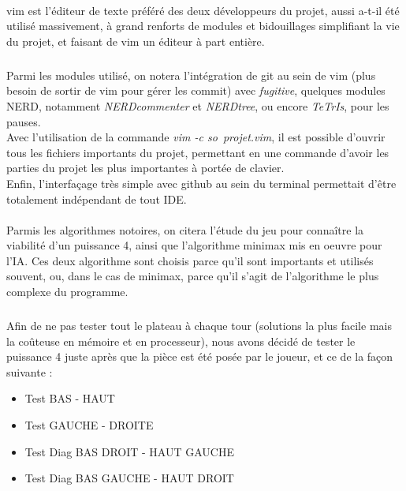 \documentclass{report}
\begin{document}
    \paragraph*{} %
    vim est l'éditeur de texte préféré des deux développeurs du projet, aussi a-t-il été utilisé massivement, à grand renforts de modules et bidouillages simplifiant la vie du projet, et
        faisant de vim un éditeur à part entière.
        \subparagraph*{} %
        Parmi les modules utilisé, on notera l'intégration de git au sein de vim (plus besoin de sortir de vim pour gérer les commit) avec \textit{fugitive}, quelques modules NERD, 
            notamment \textit{NERDcommenter} et \textit{NERDtree}, ou encore \textit{TeTrIs}, pour les pauses. \\
        Avec l'utilisation de la commande \textit{vim -c so\ projet.vim}, il est possible d'ouvrir tous les fichiers importants du projet, permettant en une commande d'avoir les 
            parties du projet les plus importantes à portée de clavier.\\
        Enfin, l'interfaçage très simple avec github au sein du terminal permettait d'être totalement indépendant de tout IDE.
    \paragraph*{} %
    Parmis les algorithmes notoires, on citera l'étude du jeu pour connaître la viabilité d'un puissance 4, ainsi que l'algorithme minimax mis en oeuvre pour l'IA.
    Ces deux algorithme sont choisis parce qu'il sont importants et utilisés souvent, ou, dans le cas de minimax, parce qu'il s'agit de l'algorithme le plus complexe du programme.
        \subparagraph*{} %
	Afin de ne pas tester tout le plateau à chaque tour (solutions la plus facile mais la coûteuse en mémoire et en processeur), nous avons décidé de tester le puissance 4 juste après que la pièce est été posée par le joueur, et ce de la façon suivante : \\
	\begin{itemize}
		\item Test BAS - HAUT 
		\item Test GAUCHE - DROITE 
		\item Test Diag BAS DROIT - HAUT GAUCHE 
		\item Test Diag BAS GAUCHE - HAUT DROIT \\
	\end{itemize}
	
\end{document}
